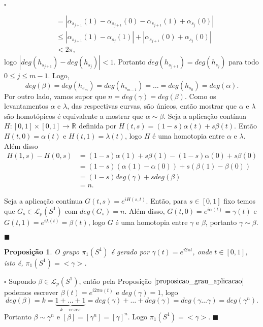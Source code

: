 \documentclass[12pt]{book}
\newtheorem{proposicao}[teorema]{Proposição}
\newenvironment{prova}[1]{$\square$ #1}{\hfill$\blacksquare$}
\newcommand{\caminhos}{\mathcal{L}}
\newcommand{\caminhospontobasegeral}[2]{\caminhos_{#1}(#2)}
\newcommand{\circulo}{S^{1}}
\newcommand{\classe}[1]{[#1]}
\newcommand{\grupofundamental}[1]{\pi_{1}(#1)}
\newcommand{\real}[1]{\mathbb{R}^{#1}}
\begin{document}
\begin{prova}
\begin{enumerate}
$$\begin{aligned}
			&= |\alpha_{s_{j+1}}(1)-\alpha_{s_{j+1}}(0) - \alpha_{s_{j+1}}(1)+\alpha_{s_{j}}(0)|
			\\
			&\leq |\alpha_{s_{j+1}}(1)-\alpha_{s_{j}}(1)| + |\alpha_{s_{j+1}}(0)+\alpha_{s_{j}}(0)|
			\\
			&<2\pi,
			\end{aligned} 
			$$
			logo $|deg(h_{s_{j+1}})-deg(h_{s_{j}})| <1$. Portanto $deg(h_{s_{j+1}})=deg(h_{s_{j}})$ para todo $0\leq j \leq m-1$. Logo, 
			$$
			deg(\beta) = deg(h_{s_{m}})=deg(h_{s_{m-1}})=\dots=deg(h_{s_{0}}) = deg(\alpha).
			$$
			Por outro lado, vamos supor que $n = deg(\gamma)=deg(\beta)$. Como os levantamentos $\alpha$ e $\lambda$, das respectivas curvas, são únicos, então mostrar que $\alpha$ e $\lambda$ são homotópicos é equivalente a mostrar que $\alpha \sim \beta$. Seja a aplicação contínua $H:[0,1]\times [0,1] \to \real{}$ definida por $H(t,s) = (1-s)\alpha(t) + s\beta(t)$. Então $H(t,0)=\alpha(t)$ e $H(t,1)=\lambda(t)$, logo $H$ é uma homotopia entre $\alpha$ e $\lambda$. Além disso 
			$$
			\begin{aligned}
			H(1,s) - H(0,s) 
			&= (1-s)\alpha(1) + s\beta(1) - (1-s)\alpha(0) + s\beta(0) 
			\\
			&= (1-s)(\alpha(1)-\alpha(0)) + s(\beta(1)-\beta(0))
			\\
			&=(1-s)deg(\gamma) +sdeg(\beta)
			\\
			&= n.
			\end{aligned}
			$$ 
			
			Seja a aplicação contínua $G(t, s) = e^{iH(s,t)}$. Então, para $s \in [0,1]$ fixo temos que $G_{s} \in \caminhospontobasegeral{p}{\circulo}$ com $deg(G_{s}) = n$. Além disso, $G(t,0) = e^{i\alpha(t)} = \gamma(t)$ e $G(t,1) = e^{i\lambda(t)} = \beta(t)$, logo $G$ é uma homotopia entre $\gamma$ e $\beta$, portanto $\gamma \sim \beta$.
		\end{enumerate}
	\end{prova}
	
	\begin{proposicao}\label{proposicao_gerador_grupo_fundamental_ciruclo}
		O grupo $\grupofundamental{\circulo}$ é gerado por $\gamma(t) = e^{i2\pi t}$, onde $t \in [0,1]$, isto é, $\grupofundamental{\circulo} = <\gamma>$.
	\end{proposicao}
	\begin{prova}
		Supondo $\beta \in \caminhospontobasegeral{p}{\circulo}$, então pela Proposição $\ref{proposicao_grau_aplicacao}$ podemos escrever $\beta(t)=e^{i2\pi \alpha(t)}$ e $deg(\gamma) = 1$, logo 
		$$
		deg(\beta) = k = \underbrace{1+\dots+1}_{k-vezes} = deg(\gamma)+\dots+deg(\gamma) = deg(\gamma \dots \gamma) = deg(\gamma^{n}).
		$$
		Portanto $\beta \sim \gamma^{n}$ e $\classe{\beta} = \classe{\gamma^{n}}=\classe{\gamma}^{n}$. Logo $\grupofundamental{\circulo} = <\gamma>$.
	\end{prova}
	
\end{document}

